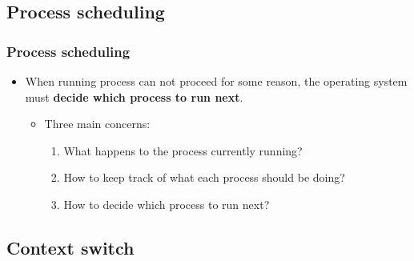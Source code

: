 \documentclass[CJKutf8,xcolor=pdftex,dvipsnames,table]{beamer}
\begin{document}
\begin{CJK*}{UTF8}{song}
  \section{Process scheduling}

  \begin{frame}
  \frametitle{Process scheduling} \pause
  \begin{itemize}
  \item{When running process can not proceed for some reason, the operating system must \textbf{decide which process to run next}.} \pause
    \begin{itemize}
    \item{Three main concerns:} \pause
      \begin{enumerate}
      \item{What happens to the process currently running?} \pause
      \item{How to keep track of what each process should be doing?} \pause
      \item{How to decide which process to run next?}
      \end{enumerate}
    \end{itemize}
  \end{itemize}
  \end{frame}

  \subsection{Context switch}


\end{CJK*}
\end{document}
